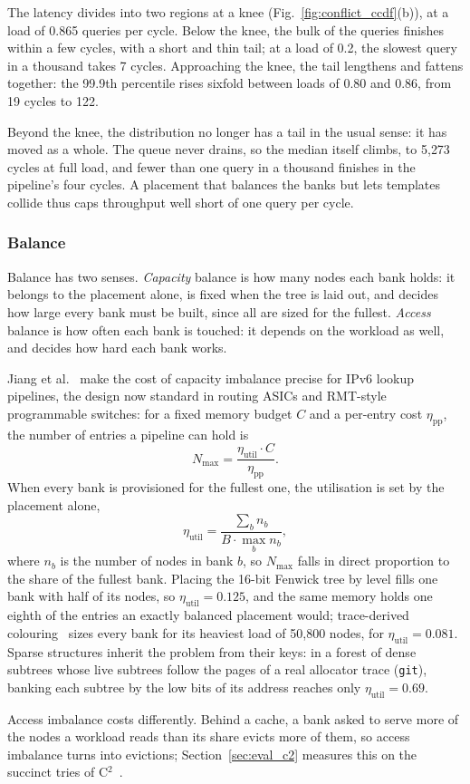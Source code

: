 The latency divides into two regions at a knee
(Fig.~\ref{fig:conflict_ccdf}(b)), at a load of 0.865 queries per cycle. Below
the knee, the bulk of the queries finishes within a few cycles, with a short
and thin tail; at a load of 0.2, the slowest query in a thousand takes
7 cycles. Approaching the knee, the tail lengthens and fattens together: the
99.9th percentile rises sixfold between loads of 0.80 and 0.86, from 19 cycles
to 122.

Beyond the knee, the distribution no longer has a tail in the usual sense: it
has moved as a whole. The queue never drains, so the median itself climbs, to
	5{,}273 cycles at full load, and fewer than one query in a thousand finishes in
the pipeline's four cycles. A placement that balances the banks but lets
templates collide thus caps throughput well short of one query per cycle.

\subsubsection{Balance}
Balance has two senses. \emph{Capacity} balance is how many nodes each bank
holds: it belongs to the placement alone, is fixed when the tree is laid out,
and decides how large every bank must be built, since all are sized for the
fullest. \emph{Access} balance is how often each bank is touched: it depends on
the workload as well, and decides how hard each bank works.

Jiang et al.~\cite{jiang2026scamp} make the cost of capacity imbalance precise
for IPv6 lookup pipelines, the design now standard in routing ASICs and
RMT-style programmable switches: for a fixed memory budget $C$ and a per-entry
cost $\eta_{\mathrm{pp}}$, the number of entries a pipeline can hold is
$$
	N_{\mathrm{max}} = \frac{\eta_{\mathrm{util}} \cdot C}{\eta_{\mathrm{pp}}}.
$$
When every bank is provisioned for the fullest one, the utilisation is set by
the placement alone,
$$
	\eta_{\mathrm{util}} = \frac{\sum_b n_b}{B \cdot \max_b n_b},
$$
where $n_b$ is the number of nodes in bank $b$, so $N_{\mathrm{max}}$ falls in
direct proportion to the share of the fullest bank. Placing the 16-bit Fenwick
tree by level fills one bank with half of its nodes, so
$\eta_{\mathrm{util}} = 0.125$, and the same memory holds one eighth of the
entries an exactly balanced placement would; trace-derived
colouring~\cite{zhou2017new} sizes every bank for its heaviest load of 50,800
nodes, for $\eta_{\mathrm{util}} = 0.081$. Sparse structures inherit the
problem from their keys: in a forest of dense subtrees whose live subtrees
follow the pages of a real allocator trace (\texttt{git}), banking each subtree
by the low bits of its address reaches only $\eta_{\mathrm{util}} = 0.69$.

Access imbalance costs differently. Behind a cache, a bank asked to serve more
of the nodes a workload reads than its share evicts more of them, so access
imbalance turns into evictions; Section~\ref{sec:eval_c2} measures this on the
succinct tries of C$^2$~\cite{zhang2027c2}.
